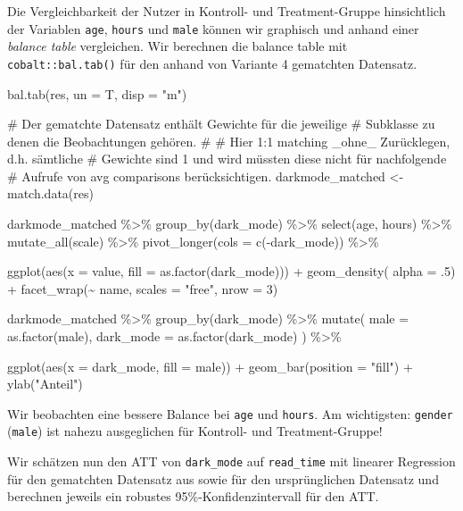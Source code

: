 \documentclass[
  a4paper,
  DIV=11,
  oneside]{scrreprt}
\newenvironment{Shaded}{\begin{snugshade}}{\end{snugshade}}
\newcommand{\NormalTok}[1]{\textcolor[rgb]{0.00,0.23,0.31}{#1}}
\begin{document}
Die Vergleichbarkeit der Nutzer in Kontroll- und Treatment-Gruppe
hinsichtlich der Variablen \texttt{age}, \texttt{hours} und
\texttt{male} können wir graphisch und anhand einer \emph{balance table}
vergleichen. Wir berechnen die balance table mit
\texttt{cobalt::bal.tab()} für den anhand von Variante 4 gematchten
Datensatz.

\begin{Shaded}
\begin{Highlighting}[]
\NormalTok{bal.tab(res, un = T, disp = "m")}

\NormalTok{\# Der gematchte Datensatz enthält Gewichte für die jeweilige }
\NormalTok{\# Subklasse zu denen die Beobachtungen gehören.}
\NormalTok{\#}
\NormalTok{\# Hier 1:1 matching \_ohne\_ Zurücklegen, d.h. sämtliche}
\NormalTok{\# Gewichte sind 1 und wird müssten diese nicht für nachfolgende }
\NormalTok{\# Aufrufe von avg comparisons berücksichtigen.}
\NormalTok{darkmode\_matched \textless{}{-} match.data(res)}

\NormalTok{darkmode\_matched \%\textgreater{}\%}
\NormalTok{  group\_by(dark\_mode) \%\textgreater{}\%}
\NormalTok{  select(age, hours) \%\textgreater{}\%}
\NormalTok{  mutate\_all(scale) \%\textgreater{}\%}
\NormalTok{  pivot\_longer(cols = c({-}dark\_mode)) \%\textgreater{}\%}
  
\NormalTok{  ggplot(aes(x = value, fill = as.factor(dark\_mode))) +}
\NormalTok{  geom\_density( alpha = .5) + }
\NormalTok{  facet\_wrap(\textasciitilde{} name, scales = "free", nrow = 3)}

\NormalTok{darkmode\_matched \%\textgreater{}\% }
\NormalTok{  group\_by(dark\_mode) \%\textgreater{}\%}
\NormalTok{  mutate(}
\NormalTok{    male = as.factor(male), }
\NormalTok{    dark\_mode = as.factor(dark\_mode)}
\NormalTok{  ) \%\textgreater{}\%}
  
\NormalTok{  ggplot(aes(x = dark\_mode, fill = male)) +}
\NormalTok{  geom\_bar(position = "fill") +}
\NormalTok{  ylab("Anteil")}
\end{Highlighting}
\end{Shaded}

Wir beobachten eine bessere Balance bei \texttt{age} und \texttt{hours}.
Am wichtigsten: \texttt{gender} (\texttt{male}) ist nahezu ausgeglichen
für Kontroll- und Treatment-Gruppe!

Wir schätzen nun den ATT von \texttt{dark\_mode} auf \texttt{read\_time}
mit linearer Regression für den gematchten Datensatz aus sowie für den
ursprünglichen Datensatz und berechnen jeweils ein robustes
95\%-Konfidenzintervall für den ATT.
\end{document}
